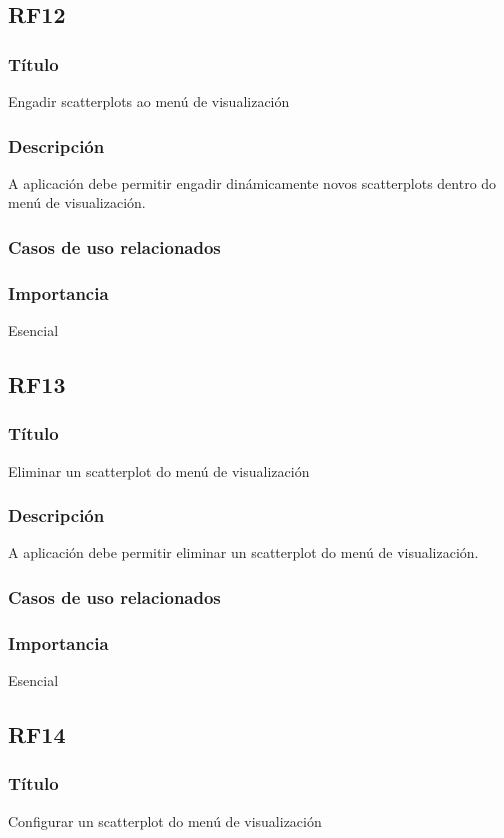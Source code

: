 \subsection{RF12}
\subsubsection{Título}
Engadir scatterplots ao menú de visualización
\subsubsection{Descripción}
A aplicación debe permitir engadir dinámicamente novos scatterplots dentro do menú de visualización.
\subsubsection{Casos de uso relacionados}
\subsubsection{Importancia}
Esencial

\subsection{RF13}
\subsubsection{Título}
Eliminar un scatterplot do menú de visualización
\subsubsection{Descripción}
A aplicación debe permitir eliminar un scatterplot do menú de visualización.
\subsubsection{Casos de uso relacionados}
\subsubsection{Importancia}
Esencial

\subsection{RF14}
\subsubsection{Título}
Configurar un scatterplot do menú de visualización
